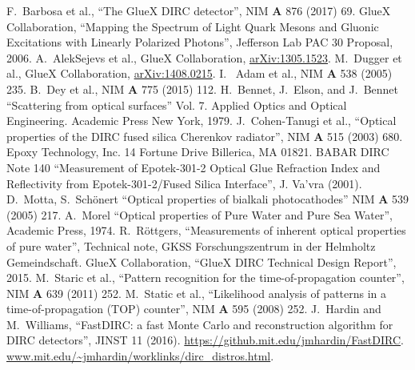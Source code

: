 \documentclass[11pt, a4paper]{article}
\begin{document}
\newpage

\begin{thebibliography}{1}
 F.~Barbosa et al., ``The GlueX DIRC detector'', NIM \textbf{A} 876 (2017) 69.
 GlueX Collaboration, ``Mapping the Spectrum of Light Quark Mesons and Gluonic Excitations with Linearly Polarized Photons'', Jefferson Lab PAC 30 Proposal, 2006.
 A.~AlekSejevs et al., GlueX Collaboration, \url{arXiv:1305.1523}.
 M.~Dugger et al., GlueX Collaboration, \url{arXiv:1408.0215}. 
 I.~ Adam et al., NIM \textbf{A} 538 (2005) 235.
 B.~Dey et al., NIM \textbf{A} 775 (2015) 112.
 H.~Bennet, J.~Elson, and J.~Bennet ``Scattering from optical surfaces'' Vol. 7. Applied Optics and Optical Engineering. Academic Press New York, 1979.
 J.~Cohen-Tanugi et al., ``Optical properties of the DIRC fused silica Cherenkov radiator'', NIM \textbf{A} 515 (2003) 680. 
 Epoxy Technology, Inc. 14 Fortune Drive Billerica, MA 01821.
 BABAR DIRC Note 140 ``Measurement of Epotek-301-2 Optical Glue Refraction Index and Reflectivity from Epotek-301-2/Fused Silica Interface'', J. Va'vra (2001).
 D.~Motta, S.~Sch{\"o}nert ``Optical properties of bialkali photocathodes'' NIM \textbf{A} 539 (2005) 217. 
 A.~Morel ``Optical properties of Pure Water and Pure Sea Water'', Academic Press, 1974.
 R.~R{\"o}ttgers, ``Measurements of inherent optical properties of pure water'', Technical note, GKSS Forschungszentrum in der Helmholtz Gemeindschaft.
 GlueX Collaboration, ``GlueX DIRC Technical Design Report'', 2015.
 M.~Staric et al., ``Pattern recognition for the time-of-propagation counter'', NIM \textbf{A} 639 (2011) 252.
 M.~Static et al., ``Likelihood analysis of patterns in a time-of-propagation (TOP) counter'', NIM \textbf{A} 595 (2008) 252.
 J.~Hardin and M.~Williams, ``FastDIRC: a fast Monte Carlo and reconstruction algorithm for DIRC detectors'', JINST 11 (2016).
\url{https://github.mit.edu/jmhardin/FastDIRC}.
\url{www.mit.edu/~jmhardin/worklinks/dirc\_distros.html}.

\end{thebibliography}
\end{document}
